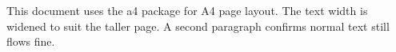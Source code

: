 \documentclass{article}
\begin{document}
This document uses the a4 package for A4 page layout.
The text width is widened to suit the taller page.
A second paragraph confirms normal text still flows fine.
\end{document}
